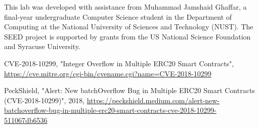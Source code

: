 This lab was developed with assistance from Muhammad Jamshaid Ghaffar, a final-year undergraduate Computer Science student in the Department of Computing at the National University of Sciences and Technology (NUST). The SEED project is supported by grants from the US National Science Foundation and Syracuse University.

\begin{thebibliography}{90}
CVE-2018-10299, "Integer Overflow in Multiple ERC20 Smart Contracts",
\url{https://cve.mitre.org/cgi-bin/cvename.cgi?name=CVE-2018-10299}

PeckShield, "Alert: New batchOverflow Bug in Multiple ERC20 Smart Contracts (CVE-2018-10299)", 2018,
\url{https://peckshield.medium.com/alert-new-batchoverflow-bug-in-multiple-erc20-smart-contracts-cve-2018-10299-511067db6536}
\end{thebibliography}

